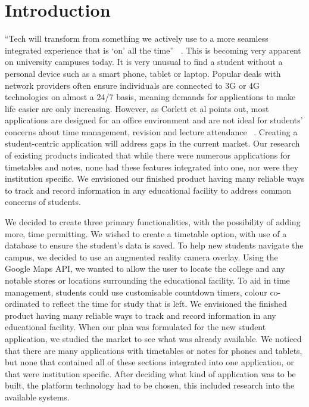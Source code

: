 \chapter{Introduction}
“Tech will transform from something we actively use to a more seamless integrated experience that is ‘on’ all the time” ~\cite{nodes}. This is becoming very apparent on university campuses today. It is very unusual to find a student without a personal device such as a smart phone, tablet or laptop. Popular deals with network providers often ensure individuals are connected to 3G or 4G technologies on almost a 24/7 basis, meaning demands for applications to make life easier are only increasing. However, as Corlett et al points out, most applications are designed for an office environment and are not ideal for students’ concerns about time management, revision and lecture attendance ~\cite{corlett}. Creating a student-centric application will address gaps in the current market. Our research of existing products indicated that while there were numerous applications for timetables and notes, none had these features integrated into one, nor were they institution specific. We envisioned our finished product having many reliable ways to track and record information in any educational facility to address common concerns of students.

We decided to create three primary functionalities, with the possibility of adding more, time permitting. We wished to create a timetable option, with use of a database to ensure the student’s data is saved. To help new students navigate the campus, we decided to use an augmented reality camera overlay. Using the Google Maps API, we wanted to allow the user to locate the college and any notable stores or locations surrounding the educational facility. To aid in time management, students could use customisable countdown timers, colour co-ordinated to reflect the time for study that is left. 
We envisioned the finished product having many reliable ways to track and record information in any educational facility. When our plan was formulated for the new student application, we studied the market to see what was already available. We noticed that there are many applications with timetables or notes for phones and tablets, but none that contained all of these sections integrated into one application, or that were institution specific. After deciding what kind of application was to be built, the platform technology had to be chosen, this included research into the available systems.
 
